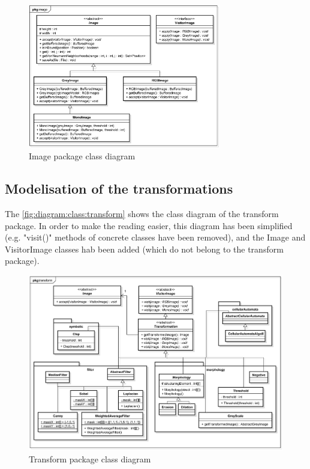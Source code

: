 \begin{figure}[ht]
	\centering 
	\includegraphics[width=0.75\textwidth]{images/diagrams/class_diagram_image}
	\caption{Image package class diagram}
	\label{fig:diagram:class:image}
\end{figure}



\subsection{Modelisation of the transformations}


The \vref{fig:diagram:class:transform} shows the class diagram of the transform package. In order to make the reading easier, this diagram has been simplified (e.g. "visit()" methods of concrete classes have been removed), and the Image and VisitorImage classes hab been added (which do not belong to the transform package). 

\begin{figure}[H]
	\centering
	\includegraphics[width=1\textwidth]{images/diagrams/class_diagram_transform}
	\caption{Transform package class diagram}
	\label{fig:diagram:class:transform}
\end{figure}


